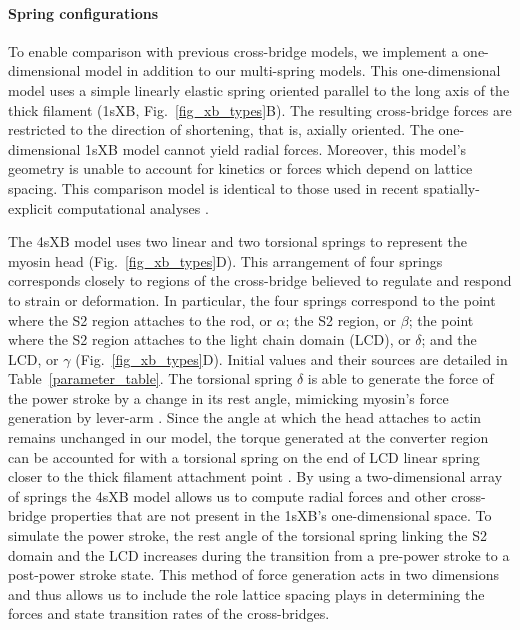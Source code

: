 \documentclass[]{article}
\begin{document}
\paragraph{Spring configurations} %
To enable comparison with previous cross-bridge models, we implement a one-dimensional model in addition to our multi-spring models. 
This one-dimensional model uses a simple linearly elastic spring oriented parallel to the long axis of the thick filament (1sXB, Fig.~\ref{fig_xb_types}B).  
The resulting cross-bridge forces are restricted to the direction of shortening, that is, axially oriented. 
The one-dimensional 1sXB model cannot yield radial forces.
Moreover, this model's geometry is unable to account for kinetics or forces which depend on lattice spacing. 
This comparison model is identical to those used in recent spatially-explicit computational analyses \citep{Daniel1998, Chase2004, Tanner2007}. 

The 4sXB model uses two linear and two torsional springs to represent the myosin head (Fig.~\ref{fig_xb_types}D).
This arrangement of four springs corresponds closely to regions of the cross-bridge believed to regulate and respond to strain or deformation. %
In particular, the four springs correspond to the point where the S2 region attaches to the rod, or $\alpha$; the S2 region, or $\beta$; the point where the S2 region attaches to the light chain domain (LCD), or $\delta$; and the LCD, or $\gamma$ (Fig.~\ref{fig_xb_types}D).
Initial values and their sources are detailed in Table~\ref{parameter_table}. 
The torsional spring $\delta$ is able to generate the force of the power stroke by a change in its rest angle, mimicking myosin's force generation by lever-arm \citep{Houdusse2000, Houdusse2001}. 
Since the angle at which the head attaches to actin remains unchanged in our model, the torque generated at the converter region can be accounted for with a torsional spring on the end of LCD linear spring closer to the thick filament attachment point \citep{Houdusse2000}. 
By using a two-dimensional array of springs the 4sXB model allows us to compute radial forces and other cross-bridge properties that are not present in the 1sXB's one-dimensional space. 
To simulate the power stroke, the rest angle of the torsional spring linking the S2 domain and the LCD increases during the transition from a pre-power stroke to a post-power stroke state.
This method of force generation acts in two dimensions and thus allows us to include the role lattice spacing plays in determining the forces and state transition rates of the cross-bridges. 
\end{document}
